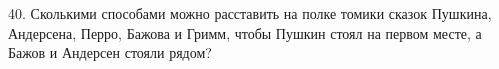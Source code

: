40. Сколькими способами можно расставить на полке томики сказок Пушкина, Андерсена, Перро, Бажова и Гримм, чтобы Пушкин стоял на первом месте, а Бажов и Андерсен стояли рядом?\\
